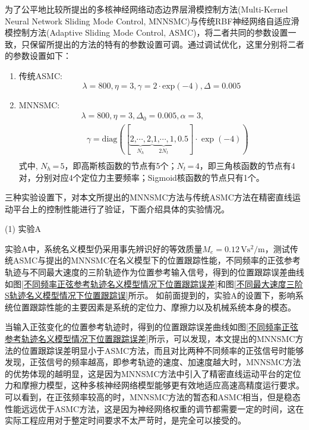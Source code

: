 为了公平地比较所提出的多核神经网络动态边界层滑模控制方法(Multi-Kernel Neural Network Sliding Mode Control, MNNSMC)与传统RBF神经网络自适应滑模控制方法(Adaptive Sliding Mode Control, ASMC)，将二者共同的参数设置一致，只保留所提出的方法的特有的参数设置可调。通过调试优化，这里分别将二者的参数设置如下：
\begin{enumerate}
	\item 传统ASMC:
	\begin{equation}
	\lambda =800\text{,}\,\eta =3\text{,}\,\gamma =2\cdot\text{exp}(-4)\text{,}\,\Delta =0.005
	\end{equation}
	\item MNNSMC:
	\begin{equation}
	\begin{aligned}
	&\lambda=800\text{,}\,\eta =3\text{,}\,{{\Delta}_{0}}=0.005\text{,}\,\alpha=3\text{,} \\ 
	&\textbf{ }\!\!{\gamma}=\text{diag}([\underbrace{2\text{,}\cdots\text{,}\,2}_{N_h}\text{,}\underbrace{1\text{,}\cdots\text{,}\,1}_{2N_t}\text{,}\,0.5]\cdot\exp(-4)) \\ 
	\end{aligned}
	\end{equation}
	式中, $N_h$\,=\,$5$，即高斯核函数的节点有5个；$N_t$\,=\,$4$，即三角核函数的节点有4对，分别对应4个定位力主要频率；Sigmoid核函数的节点只有1个。
\end{enumerate}

三种实验设置下，对本文所提出的MNNSMC方法与传统ASMC方法在精密直线运动平台上的控制性能进行了验证，下面介绍具体的实验情况。

(1) 实验A

实验A中，系统名义模型仍采用事先辨识好的等效质量$M_e=\text{0.12$\,$Vs$^{2}$/m}$，测试传统ASMC与提出的MNNSMC在名义模型下的位置跟踪性能，不同频率的正弦参考轨迹与不同最大速度的三阶轨迹作为位置参考输入信号，得到的位置跟踪误差曲线如图\ref{不同频率正弦参考轨迹名义模型情况下位置跟踪误差}和图\ref{不同最大速度三阶S轨迹名义模型情况下位置跟踪误}所示。
如前面提到的，实验A的设置下，影响系统位置跟踪性能的主要因素是系统的定位力、摩擦力以及机械系统本身的模态。

当输入正弦变化的位置参考轨迹时，得到的位置跟踪误差曲线如图\ref{不同频率正弦参考轨迹名义模型情况下位置跟踪误差}所示，可以发现，本文提出的MNNSMC方法的位置跟踪误差明显小于ASMC方法，而且对比两种不同频率的正弦信号时能够发现，正弦信号的频率越高，即参考轨迹的速度、加速度越大时，MNNSMC方法的优势体现的越明显，这是因为MNNSMC方法中引入了精密直线运动平台的定位力和摩擦力模型，这种多核神经网络模型能够更有效地适应高速高精度运行要求。可以看到，在正弦频率较高的时，MNNSMC方法的暂态和ASMC相当，但是稳态性能远远优于ASMC方法，这是因为神经网络权重的调节都需要一定的时间，这在实际工程应用对于整定时间要求不太严苛时，是完全可以接受的。


